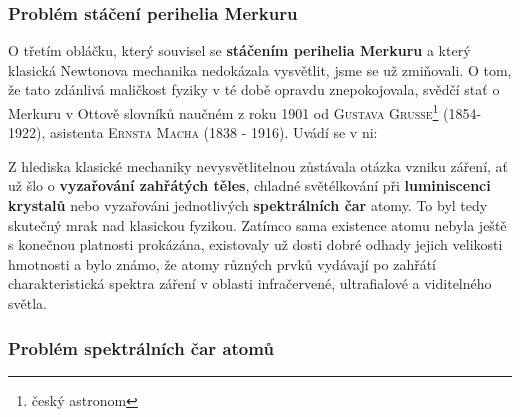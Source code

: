      \subsubsection{Problém stáčení perihelia Merkuru}\label{fyz:IchapIIsecIVssecIsssecII}  

        O třetím obláčku, který souvisel se \textbf{stáčením perihelia Merkuru} a který klasická
        Newtonova mechanika nedokázala vysvětlit, jsme se už zmiňovali. O tom, že tato zdánlivá
        maličkost fyziky v té době opravdu znepokojovala, svědčí stať o Merkuru v Ottově slovníků
        naučném z roku 1901 od \textsc{Gustava Grusse}\footnote{český astronom} (1854-1922),
        asistenta \textsc{Ernsta Macha} (1838 - 1916). Uvádí se v ni: \emph{} 


      Z hlediska klasické mechaniky nevysvětlitelnou zůstávala otázka vzniku záření, ať už šlo o
      \textbf{vyzařování zahřátých těles}, chladné světélkování při \textbf{luminiscenci krystalů}
      nebo vyzařováni jednotlivých \textbf{spektrálních čar} atomy. To byl tedy skutečný mrak nad
      klasickou fyzikou. Zatímco sama existence atomu nebyla ještě s konečnou platnosti prokázána,
      existovaly už dosti dobré odhady jejich velikosti hmotnosti a bylo známo, že atomy různých
      prvků vydávají po zahřátí charakteristická spektra záření v oblasti infračervené, ultrafialové
      a viditelného světla.

      \subsubsection{Problém spektrálních čar atomů}\label{fyz:IchapIIsecIVssecIsssecIII}

